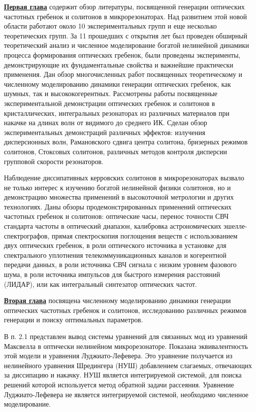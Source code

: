 \underline{\textbf{Первая глава}} содержит обзор литературы, посвященной генерации оптических частотных гребенок и солитонов в микрорезонаторах. Над развитием этой новой области работают около 10 экспериментальных групп и еще несколько теоретических групп. За 11 прошедших с открытия лет был проведен обширный теоретический анализ и численное моделирование богатой нелинейной динамики процесса формирования оптических гребенок, были проведены эксперименты, демонстрирующие их фундаментальные свойства и важнейшие практически применения. Дан обзор многочисленных работ посвященных теоретическому и численному моделированию динамики генерации оптических гребенок, как шумных, так и высококогерентных. Рассмотрены работы посвященные экспериментальной демонстрации оптических гребенок и солитонов в кристаллических, интегральных резонаторах из различных материалов при накачке на длинах волн от видимого до среднего ИК. Сделан обзор экспериментальных демонстраций различных эффектов: излучения дисперсионных волн, Рамановского сдвига центра солитона, бризерных режимов солитонов, Стоксовых солитонов, различных методов контроля дисперсии групповой скорости резонаторов.

Наблюдение диссипативных керровских солитонов в микрорезонаторах вызвало не только интерес к изучению богатой нелинейной физики солитонов, но и демонстрацию множества применений в высокоточной метрологии и других технологиях. Даны обзоры продемонстрированных применений оптических частотных гребенок и солитонов: оптические часы, перенос точности СВЧ стандарта частоты в оптический диапазон, калибровка астрономических эшелле-спектрографов, прямая спектроскопия поглощения веществ с использованием двух оптических гребенок, в роли оптического источника в установке для спектрального уплотнения телекоммуникационных каналов и когерентной передачи данных, в роли источника СВЧ сигнала с низким уровнем фазового шума, в роли источника импульсов для быстрого измерения расстояний (ЛИДАР), или как интегральный синтезатор оптических частот.

\underline{\textbf{Вторая глава}} посвящена численному моделированию динамики генерации оптических частотных гребенок и солитонов, исследованию различных режимов генерации и поиску оптимальных параметров.

В п. 2.1 представлен вывод системы уравнений для связанных мод из уравнений Максвелла в оптически нелинейном микрорезонаторе. Показана эквивалентность этой модели и уравнения Луджиато-Лефевера. Это уравнение получается из нелинейного уравнения Шредингера (НУШ) добавлением слагаемых, отвечающих за диссипацию и накачку. НУШ является интегрируемой системой, для поиска решений которой используется метод обратной задачи рассеяния. Уравнение Луджиато-Лефевера не является интегрируемой системой, необходимо численное моделирование.

